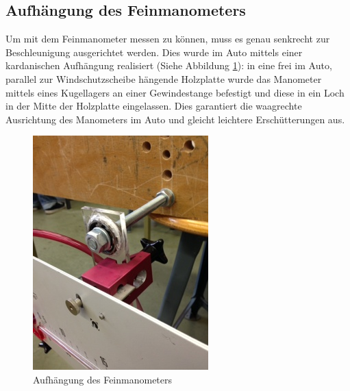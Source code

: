 \subsection{Aufhängung des Feinmanometers}
Um mit dem Feinmanometer messen zu können, muss es genau senkrecht zur Beschleunigung ausgerichtet werden. Dies wurde im Auto mittels einer kardanischen Aufhängung realisiert (Siehe Abbildung \ref{aufhängung}): in eine frei im Auto, parallel zur Windschutzscheibe hängende Holzplatte wurde das Manometer mittels eines Kugellagers an einer Gewindestange befestigt und diese in ein Loch in der Mitte der Holzplatte eingelassen. Dies garantiert die waagrechte Ausrichtung des Manometers im Auto und gleicht leichtere Erschütterungen aus. 


\begin{figure}
\centering
	\includegraphics[width=.5\textwidth]{images/aufhaengung.JPG}
	\caption{Aufhängung des Feinmanometers}
	\label{aufhängung}
\end{figure}
